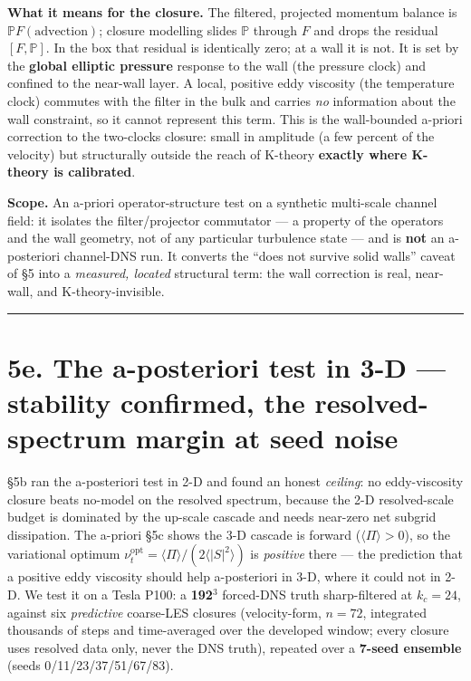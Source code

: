 \documentclass[aps,prfluids,preprint,superscriptaddress,nofootinbib]{revtex4-2}
\begin{document}
\textbf{What it means for the closure.} The filtered, projected momentum balance is $\mathbb{P}F(\text{advection})$; closure modelling slides $\mathbb{P}$ through $F$ and drops the residual $[F,\mathbb{P}]$. In the box that residual is identically zero; at a wall it is not. It is set by the \textbf{global elliptic pressure} response to the wall (the pressure clock) and confined to the near-wall layer. A local, positive eddy viscosity (the temperature clock) commutes with the filter in the bulk and carries \emph{no} information about the wall constraint, so it cannot represent this term. This is the wall-bounded a-priori correction to the two-clocks closure: small in amplitude (a few percent of the velocity) but structurally outside the reach of K-theory \textbf{exactly where K-theory is calibrated}.


\textbf{Scope.} An a-priori operator-structure test on a synthetic multi-scale channel field: it isolates the filter/projector commutator --- a property of the operators and the wall geometry, not of any particular turbulence state --- and is \textbf{not} an a-posteriori channel-DNS run. It converts the ``does not survive solid walls'' caveat of \S5 into a \emph{measured, located} structural term: the wall correction is real, near-wall, and K-theory-invisible.


\medskip\hrule\medskip


\section*{5e. The a-posteriori test in 3-D --- stability confirmed, the resolved-spectrum margin at seed noise}


§5b ran the a-posteriori test in 2-D and found an honest \emph{ceiling}: no eddy-viscosity closure beats no-model on the resolved spectrum, because the 2-D resolved-scale budget is dominated by the up-scale cascade and needs near-zero net subgrid dissipation. The a-priori §5c shows the 3-D cascade is forward ($\langle \Pi \rangle >0$), so the variational optimum $\nu _{t}^{\mathrm{opt}}=\langle \Pi \rangle /(2\langle |S|^{2}\rangle )$ is \emph{positive} there --- the prediction that a positive eddy viscosity should help a-posteriori in 3-D, where it could not in 2-D. We test it on a Tesla P100: a \textbf{192\ensuremath{^{3}}} forced-DNS truth sharp-filtered at $k_{c}=24$, against six \emph{predictive} coarse-LES closures (velocity-form, $n=72$, integrated thousands of steps and time-averaged over the developed window; every closure uses resolved data only, never the DNS truth), repeated over a \textbf{7-seed ensemble} (seeds 0/11/23/37/51/67/83).
\end{document}
